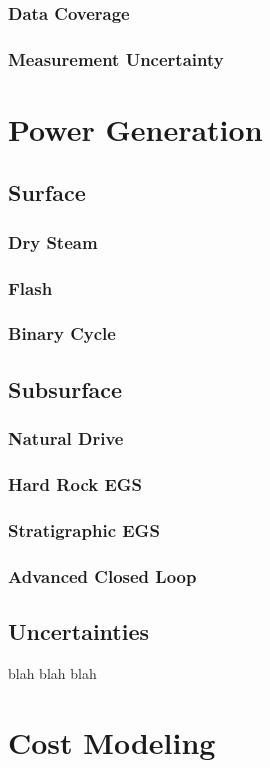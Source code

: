 \subsubsection{Data Coverage}
\subsubsection{Measurement Uncertainty}
\section{Power Generation}\label{ch2:elec}
\subsection{Surface}
\subsubsection{Dry Steam}
\subsubsection{Flash}
\subsubsection{Binary Cycle}
\subsection{Subsurface}
\subsubsection{Natural Drive}
\subsubsection{Hard Rock EGS}
\subsubsection{Stratigraphic EGS}
\subsubsection{Advanced Closed Loop}
\subsection{Uncertainties}
blah blah blah

\section{Cost Modeling}\label{ch2:costmod}
